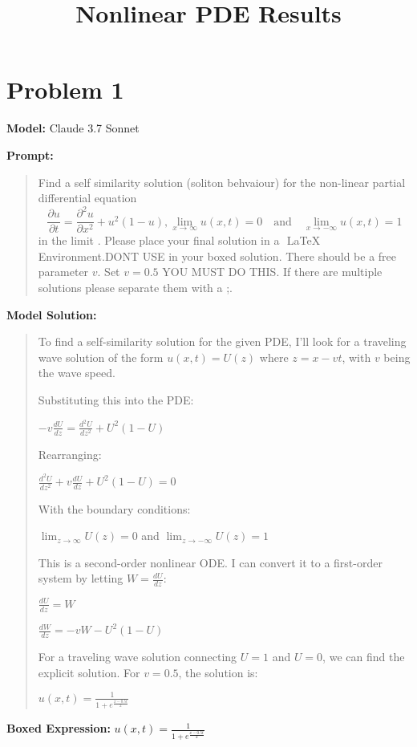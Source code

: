 \documentclass{article}
\title{Nonlinear PDE Results}
\begin{document}
\maketitle
\section*{Problem 1}
\textbf{Model:} Claude 3.7 Sonnet

\textbf{Prompt:}
\begin{quote}
Find a self similarity solution (soliton behvaiour) for the non-linear partial differential equation $$ \frac{\partial u}{\partial t} = \frac{\partial^2 u}{\partial x^2} + u^2 (1-u), \lim_{x \to \infty} u(x, t) = 0 \quad \text{and} \quad \lim_{x \to -\infty} u(x, t) = 1 $$ in the limit . Please place your final solution in a $\boxed{}$ LaTeX Environment.DONT USE \operatorname in your boxed solution. There should be a free parameter $v$. Set $v=0.5$ YOU MUST DO THIS. If there are multiple solutions please separate them with a ;.
\end{quote}
\textbf{Model Solution:}
\begin{quote}
To find a self-similarity solution for the given PDE, I'll look for a traveling wave solution of the form $u(x,t) = U(z)$ where $z = x - vt$, with $v$ being the wave speed.



Substituting this into the PDE:

$-v\frac{dU}{dz} = \frac{d^2U}{dz^2} + U^2(1-U)$



Rearranging:

$\frac{d^2U}{dz^2} + v\frac{dU}{dz} + U^2(1-U) = 0$



With the boundary conditions:

$\lim_{z\to\infty} U(z) = 0$ and $\lim_{z\to-\infty} U(z) = 1$



This is a second-order nonlinear ODE. I can convert it to a first-order system by letting $W = \frac{dU}{dz}$:

$\frac{dU}{dz} = W$

$\frac{dW}{dz} = -vW - U^2(1-U)$



For a traveling wave solution connecting $U=1$ and $U=0$, we can find the explicit solution. For $v=0.5$, the solution is:



$\boxed{u(x,t) = \frac{1}{1+e^{\frac{x-0.5t}{2}}}}$
\end{quote}
\textbf{Boxed Expression:} $u(x,t) = \frac{1}{1+e^{\frac{x-0.5t}{2}}}$
\end{document}
